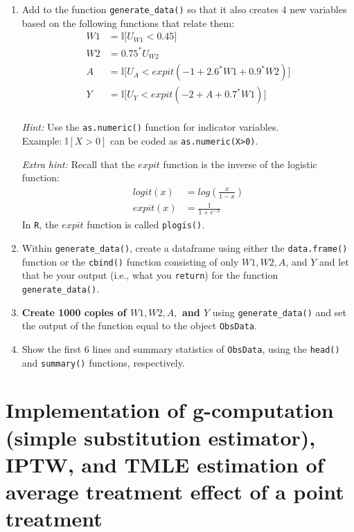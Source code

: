 \documentclass{exam}
\begin{document}
\begin{enumerate}
\item Add to the function \texttt{generate\_data()} so that it also creates 4 new variables based on the following functions that relate them:
\begin{align*}
W1&=\mathbb{I}\big[ U_{W1}<0.45 \big]\\
W2&= 0.75^*U_{W2}\\
A&=\mathbb{I}\big[ U_A < expit(-1+2.6^*W1+0.9^*W2) \big]\\
Y&=\mathbb{I}\big[ U_Y < expit(-2+A+0.7^*W1) \big] \\
\end{align*}

\emph{Hint:} Use the \texttt{as.numeric()} function for indicator variables. \\
Example: $\mathbb{I}[X > 0]$ can be coded as \texttt{as.numeric(X>0)}.

\emph{Extra hint:} Recall that the $expit$ function is the inverse of the logistic function:
\begin{align*}
logit(x) &= log\left(\frac{x}{1-x} \right)\\
expit(x) &=\frac{1}{1+e^{-x}}
 \end{align*}
In \texttt{R}, the $expit$ function is called \texttt{plogis()}.

\item Within \texttt{generate\_data()}, create a dataframe using either the \texttt{data.frame()} function or the \texttt{cbind()} function consisting of only $W1, W2, A$, and $Y$ and let that be your output (i.e., what you \texttt{return}) for the function \texttt{generate\_data()}. 

\item \textbf{Create 1000 copies of $W1, W2, A,$ and $Y$} using \texttt{generate\_data()} and set the output of the function equal to the object \texttt{ObsData}.

\item Show the first 6 lines and summary statistics of \texttt{ObsData}, using the \texttt{head()} and \texttt{summary()} functions, respectively.
\end{enumerate}

\begin{solution}
\end{solution}

\section{Implementation of g-computation (simple substitution estimator), IPTW, and TMLE estimation of average treatment effect of a point treatment}
\end{document}

